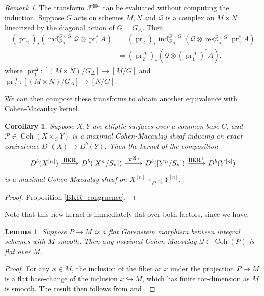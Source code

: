\documentclass{amsart}
\theoremstyle{plain}
\newtheorem{lemma}[theorem]{Lemma}
\newtheorem{corollary}[theorem]{Corollary}
\theoremstyle{definition}
\theoremstyle{remark}
\newtheorem{remark}[theorem]{Remark}
\begin{document}
    \begin{remark}\label{powerfm}
        The transform $\mathcal F^{\boxtimes n}$ can be evaluated without computing the induction.
        Suppose $G$ acts on schemes $M,N$ and $\mathcal Q$ is a complex on $M\times N$ linearized by the diagonal action of $G=G_\Delta$.
        Then
        \begin{align*}
            (\operatorname{pr}_2)_\ast(\operatorname{ind}_{G_\Delta}^{G\times G}\mathcal Q\otimes \operatorname{pr}_1^\ast A)&=(\operatorname{pr}_2)_\ast\operatorname{ind}_{G_\Delta}^{G\times G}(\mathcal Q\otimes \operatorname{res}_{G_\Delta}^{G\times G}\operatorname{pr}_1^\ast A)\\
            &=(\operatorname{pr}_2^\Delta)_\ast(\mathcal Q\otimes (\operatorname{pr}_1^\Delta)^\ast A),
        \end{align*}
        where $\operatorname{pr}_1^\Delta:[(M\times N)/G_\Delta]\to [M/G]$ and $\operatorname{pr}_2^\Delta:[(M\times N)/G_\Delta]\to [N/G]$.
    \end{remark}

    We can then compose these transforms to obtain another equivalence with Cohen-Macaulay kernel.
    \begin{corollary}\label{BKR_finalform}
        Suppose $X,Y$ are elliptic surfaces over a common base $C$, and $\mathcal P\in \operatorname{Coh}(X\times_CY)$ is a maximal Cohen-Macaulay sheaf inducing an exact equivalence $D^b(X)\to D^b(Y)$.
        Then the kernel of the composition
        \[
        \begin{tikzcd}
        D^b(X^{[n]})\arrow{r}{\operatorname{BKR}}&D^b([X^n/S_n])\arrow{r}{\mathcal F^{\boxtimes n}}&D^b([Y^n/S_n])\arrow{r}{\operatorname{BKR}^\top}&D^b(Y^{[n]})
        \end{tikzcd}
        \]
        is a maximal Cohen-Macaulay sheaf on $X^{[n]}\times_{C^{[n]}}Y^{[n]}$.
    \end{corollary}
    \begin{proof}
        Proposition \ref{BKR_congruence}.
    \end{proof}

    Note that this new kernel is immediately flat over both factors, since we have:
    \begin{lemma}
        Suppose $P\to M$ is a flat Gorenstein morphism between integral schemes with $M$ smooth.
        Then any maximal Cohen-Macaulay $\mathcal Q\in\operatorname{Coh}(P)$ is flat over $M$.
    \end{lemma}
    \begin{proof}
        For any $x\in M$, the inclusion of the fiber at $x$ under the projection $P\to M$ is a flat base-change of the inclusion $x\hookrightarrow M$, which has finite tor-dimension as $M$ is smooth.
        The result then follows from \cite[Lemma 2.3]{arinkin} and \cite[Lemma 3.31]{HuyFM}.
    \end{proof}
\end{document}
